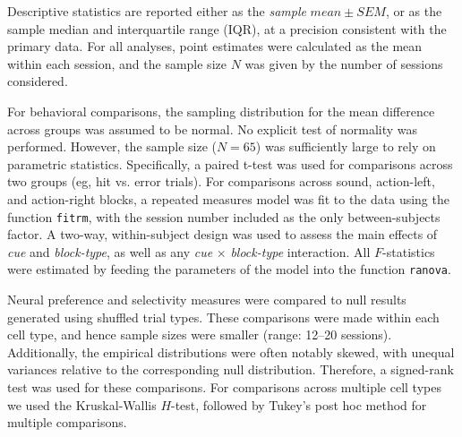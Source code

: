 Descriptive statistics are reported either as the \emph{sample} $mean \pm SEM$, or as the sample median and interquartile range (IQR), at a precision consistent with the primary data. For all analyses, point estimates were calculated as the mean within each session, and the sample size $N$ was given by the number of sessions considered. 

For behavioral comparisons, the sampling distribution for the mean difference across groups was assumed to be normal. No explicit test of normality was performed. However, the sample size  ($N=65$) was sufficiently large to rely on parametric statistics. Specifically, a paired t-test was used for comparisons across two groups (eg, hit vs. error trials). For comparisons across sound, action-left, and action-right blocks, a repeated measures model was fit to the data using the function \texttt{fitrm}, with the session number included as the only between-subjects factor. A two-way, within-subject design was used to assess the main effects of \emph{cue} and \emph{block-type}, as well as any \emph{cue} $\times$ \emph{block-type} interaction. All $F$-statistics were estimated by feeding the parameters of the model into the function \texttt{ranova}.

Neural preference and selectivity measures were compared to null results generated using shuffled trial types. These comparisons were made within each cell type, and hence sample sizes were smaller (range: 12--20 sessions). Additionally, the empirical distributions were often notably skewed, with unequal variances relative to the corresponding null distribution. Therefore, a signed-rank test was used for these comparisons. For comparisons across multiple cell types we used the Kruskal-Wallis $H$-test, followed by Tukey's post hoc method for multiple comparisons. 

